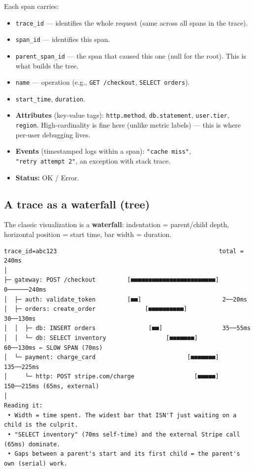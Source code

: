 \documentclass[11pt]{article}
\providecommand{\tightlist}{\setlength{\itemsep}{1pt}\setlength{\parskip}{0pt}}
\begin{document}
Each span carries:

\begin{itemize}
\tightlist
\item
  \texttt{trace\_id} --- identifies the whole request (same across all spans in the trace).
\item
  \texttt{span\_id} --- identifies this span.
\item
  \texttt{parent\_span\_id} --- the span that caused this one (null for the root). This is what builds the tree.
\item
  \texttt{name} --- operation (e.g., \texttt{GET\ /checkout}, \texttt{SELECT\ orders}).
\item
  \texttt{start\_time}, \texttt{duration}.
\item
  \textbf{Attributes} (key-value tags): \texttt{http.method}, \texttt{db.statement}, \texttt{user.tier}, \texttt{region}. High-cardinality is fine here (unlike metric labels) --- this is where per-user debugging lives.
\item
  \textbf{Events} (timestamped logs within a span): \texttt{"cache\ miss"}, \texttt{"retry\ attempt\ 2"}, an exception with stack trace.
\item
  \textbf{Status:} OK / Error.
\end{itemize}

\subsection{A trace as a waterfall (tree)}\label{a-trace-as-a-waterfall-tree}

The classic visualization is a \textbf{waterfall}: indentation = parent/child depth, horizontal position = start time, bar width = duration.

\setcodelang{}

\begin{verbatim}
trace_id=abc123                                              total = 240ms
│
├─ gateway: POST /checkout         [■■■■■■■■■■■■■■■■■■■■■■■■]  0──────240ms
│  ├─ auth: validate_token         [■■]                       2──20ms
│  ├─ orders: create_order              [■■■■■■■■■■]           30──130ms
│  │  ├─ db: INSERT orders               [■■]                 35──55ms
│  │  └─ db: SELECT inventory                 [■■■■■■■]       60──130ms ← SLOW SPAN (70ms)
│  └─ payment: charge_card                          [■■■■■■■] 135──225ms
│     └─ http: POST stripe.com/charge                 [■■■■■] 150──215ms (65ms, external)
│
Reading it:
 • Width = time spent. The widest bar that ISN'T just waiting on a child is the culprit.
 • "SELECT inventory" (70ms self-time) and the external Stripe call (65ms) dominate.
 • Gaps between a parent's start and its first child = the parent's own (serial) work.
\end{verbatim}
\end{document}
